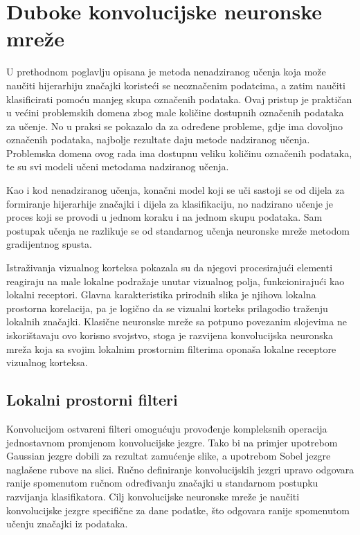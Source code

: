 \documentclass[lmodern, utf8, diplomski, numeric]{fer}
\begin{document}
\chapter{Duboke konvolucijske neuronske mreže}

U prethodnom poglavlju opisana je metoda nenadziranog učenja koja može naučiti hijerarhiju značajki koristeći se neoznačenim podatcima, a zatim naučiti klasificirati pomoću manjeg skupa označenih podataka. Ovaj pristup je praktičan u većini problemskih domena zbog male količine dostupnih označenih podataka za učenje. No u praksi se pokazalo da za određene probleme, gdje ima dovoljno označenih podataka, najbolje rezultate daju metode nadziranog učenja. Problemska domena ovog rada ima dostupnu veliku količinu označenih podataka, te su svi modeli učeni metodama nadziranog učenja.

Kao i kod nenadziranog učenja, konačni model koji se uči sastoji se od dijela za formiranje hijerarhije značajki i dijela za klasifikaciju, no nadzirano učenje je proces koji se provodi u jednom koraku i na jednom skupu podataka. Sam postupak učenja ne razlikuje se od standarnog učenja neuronske mreže metodom gradijentnog spusta.

Istraživanja vizualnog korteksa pokazala su da njegovi procesirajući elementi reagiraju na male lokalne podražaje unutar vizualnog polja, funkcionirajući kao lokalni receptori. Glavna karakteristika prirodnih slika je njihova lokalna prostorna korelacija, pa je logično da se vizualni korteks prilagodio traženju lokalnih značajki.
Klasične neuronske mreže sa potpuno povezanim slojevima ne iskorištavaju ovo korisno svojstvo, stoga je razvijena konvolucijska neuronska mreža koja sa svojim lokalnim prostornim filterima oponaša lokalne receptore vizualnog korteksa.

\section{Lokalni prostorni filteri}

Konvolucijom ostvareni filteri omogućuju provođenje kompleksnih operacija jednostavnom promjenom konvolucijske jezgre. Tako bi na primjer upotrebom Gaussian jezgre dobili za rezultat zamućenje slike, a upotrebom Sobel jezgre naglašene rubove na slici. Ručno definiranje konvolucijskih jezgri upravo odgovara ranije spomenutom ručnom određivanju značajki u standarnom postupku razvijanja klasifikatora. Cilj konvolucijske neuronske mreže je naučiti konvolucijske jezgre specifične za dane podatke, što odgovara ranije spomenutom učenju značajki iz podataka.
\end{document}
